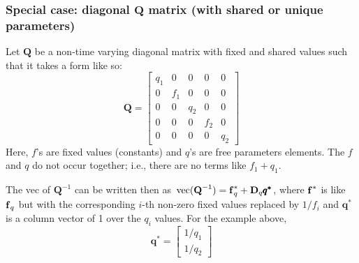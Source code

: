 \documentclass[]{article}
\def\DD{\mbox{$\mathbf D$}}	\def\dd{\mbox{$\mathbf d$}}
\def\QQ{\mbox{$\mathbf Q$}}	 \def\qq{\mbox{$\mathbf q$}} \def\Qb{\mbox{$\mathbf G$}}  \def\Qm{\mathbb{Q}}
\def\vec{\,\textup{\textrm{vec}}}
\begin{document}
\subsubsection{Special case: diagonal $\QQ$ matrix (with shared or unique parameters)}
Let $\QQ$ be a non-time varying diagonal matrix with fixed and shared values such that it takes a form like so:
\begin{equation*}
\QQ=
\begin{bmatrix}
q_1&0&0&0&0\\
0&f_1&0&0&0\\
0&0&q_2&0&0\\
0&0&0&f_2&0\\
0&0&0&0&q_2
\end{bmatrix}
\end{equation*}
Here, $f$'s are fixed values (constants) and $q$'s are free parameters elements.  The $f$ and $q$ do not occur together; i.e., there are no terms like $f_1+q_1$.


The vec of $\QQ^{-1}$ can be written then as $\vec(\QQ^{-1}) = \ff^{*}_q + \DD_q \pmb{q^{*}}$, where $\mbox{$\mathbf f$}^{*}$ is like $\mbox{$\mathbf f$}_q$ but with the corresponding $i$-th non-zero fixed values replaced by $1/f_i$ and $\pmb{q^{*}}$ is a column vector of 1 over the $q_i$ values.  For the example above,
\begin{equation*}
\pmb{q^{*}} =
\begin{bmatrix}
1/q_1 \\ 1/q_2
\end{bmatrix}
\end{equation*}
\end{document}
